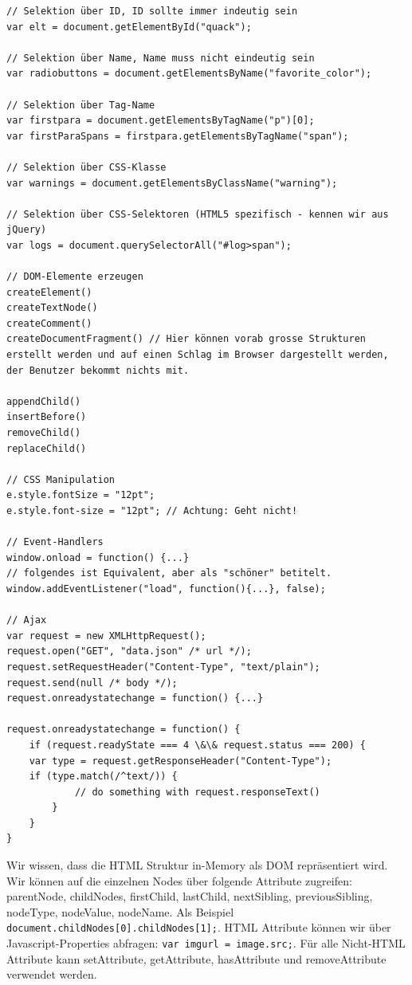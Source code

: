 \begin{lstlisting}[label=lst:dom-manipulation,caption=DOM Manipulation]
// Selektion über ID, ID sollte immer indeutig sein
var elt = document.getElementById("quack");

// Selektion über Name, Name muss nicht eindeutig sein
var radiobuttons = document.getElementsByName("favorite_color");

// Selektion über Tag-Name
var firstpara = document.getElementsByTagName("p")[0];
var firstParaSpans = firstpara.getElementsByTagName("span");

// Selektion über CSS-Klasse
var warnings = document.getElementsByClassName("warning");

// Selektion über CSS-Selektoren (HTML5 spezifisch - kennen wir aus jQuery)
var logs = document.querySelectorAll("#log>span");

// DOM-Elemente erzeugen
createElement()
createTextNode()
createComment()
createDocumentFragment() // Hier können vorab grosse Strukturen erstellt werden und auf einen Schlag im Browser dargestellt werden, der Benutzer bekommt nichts mit.

appendChild()
insertBefore()
removeChild()
replaceChild()

// CSS Manipulation
e.style.fontSize = "12pt";
e.style.font-size = "12pt"; // Achtung: Geht nicht!

// Event-Handlers
window.onload = function() {...}
// folgendes ist Equivalent, aber als "schöner" betitelt.
window.addEventListener("load", function(){...}, false);

// Ajax
var request = new XMLHttpRequest();
request.open("GET", "data.json" /* url */);
request.setRequestHeader("Content-Type", "text/plain");
request.send(null /* body */);
request.onreadystatechange = function() {...}

request.onreadystatechange = function() {
	if (request.readyState === 4 \&\& request.status === 200) {
	var type = request.getResponseHeader("Content-Type");
	if (type.match(/^text/)) {
			// do something with request.responseText()
		}
	}
}
\end{lstlisting}

Wir wissen, dass die HTML Struktur in-Memory als DOM repräsentiert wird. Wir können auf die einzelnen Nodes über folgende Attribute zugreifen: parentNode, childNodes, firstChild, lastChild, nextSibling, previousSibling, nodeType, nodeValue, nodeName. Als Beispiel \lstinline|document.childNodes[0].childNodes[1];|. HTML Attribute können wir über Javascript-Properties abfragen: \lstinline|var imgurl = image.src;|. Für alle Nicht-HTML Attribute kann setAttribute, getAttribute, hasAttribute und removeAttribute verwendet werden.

